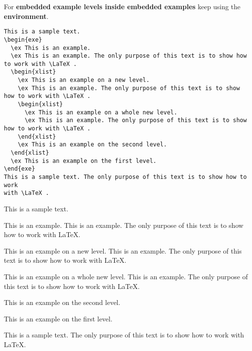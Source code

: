 \begin{frame}[fragile]

For \textbf{embedded example levels inside embedded examples} keep using the  \textbf{environment}.
{\footnotesize 
\begin{lstlisting}
This is a sample text. 
\begin{exe}
  \ex This is an example.
  \ex This is an example. The only purpose of this text is to show how to work with \LaTeX .
  \begin{xlist}
    \ex This is an example on a new level.
    \ex This is an example. The only purpose of this text is to show how to work with \LaTeX .
    \begin{xlist}
      \ex This is an example on a whole new level.
      \ex This is an example. The only purpose of this text is to show how to work with \LaTeX .
    \end{xlist}
    \ex This is an example on the second level.
  \end{xlist}		
  \ex This is an example on the first level.
\end{exe}	
This is a sample text. The only purpose of this text is to show how to work 
with \LaTeX .
\end{lstlisting}
}
\end{frame}

\begin{frame}[fragile]

This is a sample text. 
\begin{exe}
	\ex This is an example.
	\ex This is an example. The only purpose of this text is to show how to work with \LaTeX .
	\begin{xlist}
		\ex This is an example on a new level.
		\ex This is an example. The only purpose of this text is to show how to work with \LaTeX .
		\begin{xlist}
			\ex This is an example on a whole new level.
			\ex This is an example. The only purpose of this text is to show how to work with \LaTeX .
		\end{xlist}
		\ex This is an example on the second level.
	\end{xlist}		
	\ex This is an example on the first level.
\end{exe}	
This is a sample text. The only purpose of this text is to show how to work 
with \LaTeX .
\end{frame}


